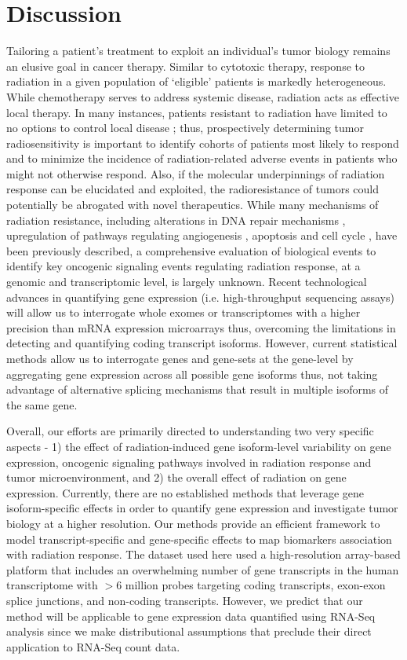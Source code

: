 \documentclass[hidelinks,11pt]{article}
\begin{document}
\section*{Discussion}

Tailoring a patient's treatment to exploit an individual's tumor biology remains an elusive goal in cancer therapy.  Similar to cytotoxic therapy, response to radiation in a given population of `eligible' patients is markedly heterogeneous. While chemotherapy serves to address systemic disease, radiation acts as effective local therapy.  In many instances, patients resistant to radiation have limited to no options to control local disease \cite{roca,roca_eschrich,baumann_krause}; thus, prospectively determining tumor radiosensitivity is important to identify cohorts of patients most likely to respond and to minimize the incidence of radiation-related adverse events in patients who might not otherwise respond. Also, if the molecular underpinnings of radiation response can be elucidated and exploited, the radioresistance of tumors could potentially be abrogated with novel therapeutics. While many mechanisms of radiation resistance, including alterations in DNA repair mechanisms \cite{dna_repair}, upregulation of pathways regulating angiogenesis \cite{angio}, apoptosis \cite{apoptosis} and cell cycle \cite{cell_cycle}, have been previously described, a comprehensive evaluation of biological events to identify key oncogenic signaling events regulating radiation response, at a genomic and transcriptomic level, is largely unknown. Recent technological advances in quantifying gene expression (i.e. high-throughput sequencing assays) will allow us to interrogate whole exomes or transcriptomes with a higher precision than mRNA expression microarrays thus, overcoming the limitations in detecting and quantifying coding transcript isoforms. However, current statistical methods allow us to interrogate genes and gene-sets at the gene-level by aggregating gene expression across all possible gene isoforms thus, not taking advantage of alternative splicing mechanisms that result in multiple isoforms of the same gene. 

Overall, our efforts are primarily directed to understanding two very specific aspects - 1) the effect of radiation-induced gene isoform-level variability on gene expression, oncogenic signaling pathways involved in radiation response and tumor microenvironment, and 2) the overall effect of radiation on gene expression. Currently, there are no established methods that leverage gene isoform-specific effects in order to quantify gene expression and investigate tumor biology at a higher resolution. Our methods provide an efficient framework to model transcript-specific and gene-specific effects to map biomarkers association with radiation response. The dataset used here used a high-resolution array-based platform that includes an overwhelming number of gene transcripts in the human transcriptome with $>$6 million probes targeting coding transcripts, exon-exon splice junctions, and non-coding transcripts. 
However, we predict that our method will be applicable to gene expression data quantified using RNA-Seq analysis since we make distributional assumptions that preclude their direct application to RNA-Seq count data. 
\end{document}

